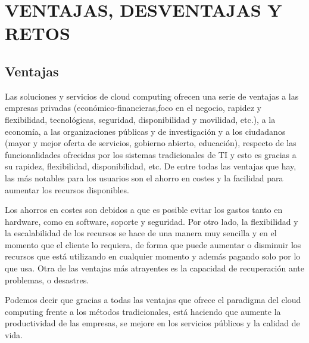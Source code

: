 \documentclass[a4paper, 12pt]{report}
\begin{document}
\chapter{VENTAJAS, DESVENTAJAS Y RETOS}
\vspace*{-2em}
\section{Ventajas}
\begin{justify}
Las soluciones y servicios de cloud computing ofrecen una serie de ventajas a las empresas privadas (econ\'omico-financieras,foco en el negocio, rapidez y flexibilidad, tecnol\'ogicas, seguridad, disponibilidad y movilidad, etc.), a la econom\'ia, a las organizaciones p\'ublicas y de investigaci\'on y a los ciudadanos (mayor y mejor oferta de servicios, gobierno abierto, educaci\'on), respecto de las funcionalidades ofrecidas por los sistemas tradicionales de TI y esto es gracias a su rapidez, flexibilidad, disponibilidad, etc. De entre todas las ventajas que hay, las más notables para los usuarios son el ahorro en costes y la facilidad para aumentar los recursos disponibles.

Los ahorros en costes son debidos a que es posible evitar los gastos tanto en hardware, como en software, soporte y seguridad. Por otro lado, la flexibilidad y la escalabilidad de los recursos se hace de una manera muy sencilla y en el momento que el cliente lo requiera, de forma que puede aumentar o disminuir los recursos que está utilizando en cualquier momento y adem\'as pagando solo por lo que usa. Otra de las ventajas m\'as atrayentes es la capacidad de recuperación ante problemas, o desastres.

Podemos decir que gracias a todas las ventajas que ofrece el paradigma del cloud computing frente a los m\'etodos tradicionales, est\'a haciendo que aumente la productividad de las empresas, se mejore en los servicios públicos y la calidad de vida.

\end{justify}
\newpage
\end{document}
